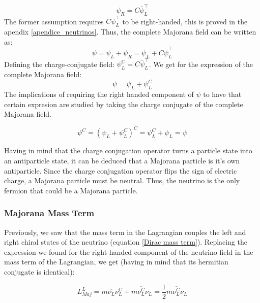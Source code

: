 \begin{equation}
\psi_R = C \overline{\psi}^\intercal_L
\end{equation}
The former assumption requires $C \overline{\psi}^\intercal_L$ to be right-handed, this is proved in the apendix \ref{apendice_neutrinos}. Thus, the complete Majorana field can be written as:
\begin{equation}
\psi = \psi_L + \psi_R = \psi_L + C \overline{\psi}^\intercal_L
\end{equation}
Defining the charge-conjugate field: $\psi^C_L = C \overline{\psi}^\intercal_L$. We get for the expression of the complete Majorana field:
\begin{equation}
\psi = \psi_L + \psi^C_L
\end{equation}
The implications of requiring the right handed component of $\psi$ to have that certain expresion are studied by taking the charge conjugate of the complete Majorana field. 

\begin{equation}
\psi^C = (\psi_L + \psi^C_L)^C = \psi^C_L + \psi_L = \psi
\end{equation}

Having in mind that the charge conjugation operator turns a particle state into an antiparticle state, it can be deduced that a Majorana particle is it's own antiparticle. Since the charge conjugation operator flips the sign of electric charge, a Majorana particle must be neutral. Thus, the neutrino is the only fermion that could be a Majorana particle.

\subsubsection{Majorana Mass Term}

Previously, we saw that the mass term in the Lagrangian couples the left and right chiral states of the neutrino (equation \ref{Dirac mass term}). Replacing the expression we found for the right-handed component of the neutrino field in the mass term of the Lagrangian, we get (having in mind that its hermitian conjugate is identical):


\begin{equation}
L_{Maj}^{L} = m \overline{\nu_L} \nu_L^C + m \overline{\nu_L^C} \nu_L = \frac{1}{2} m \overline{\nu_L^{C}} \nu_L
\end{equation}




